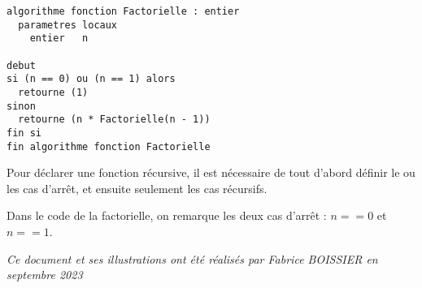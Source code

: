 \documentclass[11pt,a4paper]{article}
\begin{document}
\begin{center}
\begin{lstlisting}[style=algorithmique]
algorithme fonction Factorielle : entier
  parametres locaux
    entier   n

debut
si (n == 0) ou (n == 1) alors
  retourne (1)
sinon
  retourne (n * Factorielle(n - 1))
fin si
fin algorithme fonction Factorielle \end{lstlisting}
\end{center}


Pour déclarer une fonction récursive, il est nécessaire de tout d'abord définir le ou les cas d'arrêt, et ensuite seulement les cas récursifs.

Dans le code de la factorielle, on remarque les deux cas d'arrêt : $ n == 0 $ et $ n == 1 $.




\bigskip

\vfillFirst

\vfillLast


\begin{center}
\textit{Ce document et ses illustrations ont été réalisés par Fabrice BOISSIER en septembre 2023}
\end{center}
\end{document}
